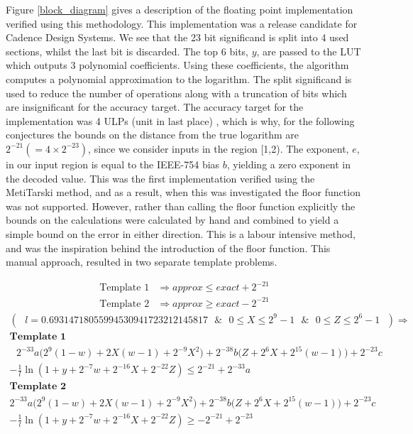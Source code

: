\documentclass{fac}
\begin{document}
Figure \ref{block_diagram} gives a description of the floating point implementation verified using this methodology. This implementation was a release candidate for Cadence Design Systems. We see that the 23 bit significand is split into 4 used sections, whilst the last bit is discarded. The top 6 bits, $y$, are passed to the LUT which outputs 3 polynomial coefficients. Using these coefficients, the algorithm computes a polynomial approximation to the logarithm. The split significand is used to reduce the number of operations along with a truncation of bits which are insignificant for the accuracy target. The accuracy target for the implementation was 4 ULPs (unit in last place) \cite{muller2010handbook}, which is why, for the following conjectures the bounds on the distance from the true logarithm are $2^{-21}(=4\times 2^{-23})$, since we consider inputs in the region [1,2). The exponent, $e$, in our input region is equal to the IEEE-754 bias $b$, yielding a zero exponent in the decoded value. This was the first implementation verified using the MetiTarski method, and as a result, when this was investigated the floor function was not supported. However, rather than calling the floor function explicitly the bounds on the calculations were calculated by hand and combined to yield a simple bound on the error in either direction. This is a labour intensive method, and was the inspiration behind the introduction of the floor function. This manual approach, resulted in two separate template problems. 

\begin{align*}
    \textrm{Template 1} &\Rightarrow approx \leq exact + 2^{-21} \\
    \textrm{Template 2} &\Rightarrow approx \geq exact - 2^{-21}
\end{align*}
\begin{multline*}
(\textrm{ }l=0.69314718055994530941723212145817\textrm{ } \&\textrm{ } 0\leq X \leq2^9-1\textrm{ } \& \textrm{ }0\leq Z \leq 2^6-1\textrm{ }) \Rightarrow \\ 
\textbf{Template 1} \\
  \textrm{ }  2^{-33} a\Big(2^9(1-w)+2X(w-1)+ 2^{-9}X^{2}\Big)   +  2^{-38} b\Big(Z +2^{6}X + 2^{15}(w-1)\Big)+  2^{-23}c\\
-  \frac{1}{l}\ln(1+y+2^{-7}w+2^{-16}X+2^{-22}Z)      \leq 2^{-21}+2^{-33}a 
\end{multline*} 
\begin{multline*}
\textbf{Template 2} \\
2^{-33} a\Big(2^9(1-w)+2X(w-1)+ 2^{-9}X^{2}\Big)   +  2^{-38} b\Big(Z +2^{6}X + 2^{15}(w-1)\Big)+  2^{-23}c\\
-  \frac{1}{l}\ln(1+y+2^{-7}w+2^{-16}X+2^{-22}Z)      \geq -2^{-21}+2^{-23}
\end{multline*}
\end{document}
